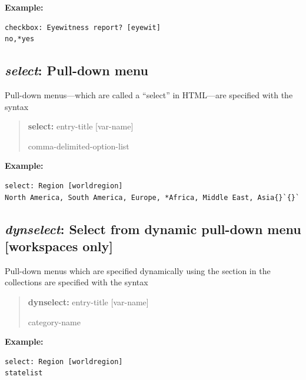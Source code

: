 \documentclass[letterpaper,10pt,english]{sphinxmanual}
\begin{document}
\textbf{Example:}

\begin{Verbatim}[commandchars=\\\{\}]
checkbox: Eyewitness report? [eyewit]
no,*yes
\end{Verbatim}


\subsection{\emph{select}: Pull-down menu}
\label{forms:select-pull-down-menu}
Pull-down menus—which are called a “select” in HTML—are specified with
the syntax
\begin{quote}

\begin{DUlineblock}{0em}
\item[] \textbf{select:} entry-title {[}var-name{]}
\item[] comma-delimited-option-list
\end{DUlineblock}
\end{quote}

\textbf{Example:}

\begin{Verbatim}[commandchars=\\\{\}]
select: Region [worldregion]
North America, South America, Europe, *Africa, Middle East, Asia{}`{}`
\end{Verbatim}


\subsection{\emph{dynselect}: Select from dynamic pull-down menu {[}workspaces only{]}}
\label{forms:dynselect-select-from-dynamic-pull-down-menu-workspaces-only}
Pull-down menus which are specified dynamically using the  section in the collections are specified with
the syntax
\begin{quote}

\begin{DUlineblock}{0em}
\item[] \textbf{dynselect:} entry-title {[}var-name{]}
\item[] category-name
\end{DUlineblock}
\end{quote}

\textbf{Example:}

\begin{Verbatim}[commandchars=\\\{\}]
select: Region [worldregion]
statelist
\end{Verbatim}
\end{document}
